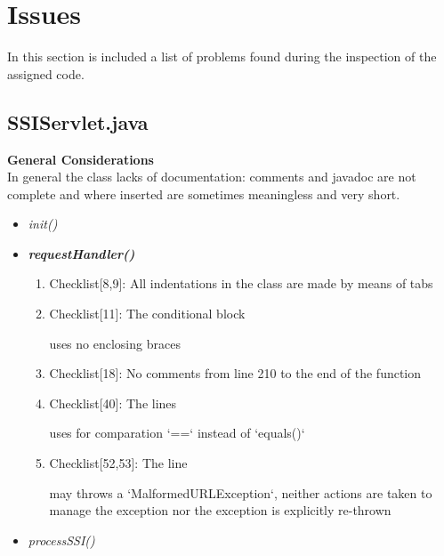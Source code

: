 \documentclass[11pt,titlepage]{article} %
\begin{document}
\section{Issues}
In this section is included a list of problems found during the inspection of the assigned code.
\subsection{SSIServlet.java}
  \textbf{General Considerations} \hfill \\
  In general the class lacks of documentation: comments and javadoc are not complete and where inserted are sometimes meaningless and very short.
  \begin{itemize}
   \item \textit{init()}
   \item \textbf{\textit{requestHandler()}}
    \begin{enumerate}
     \item Checklist[8,9]: All indentations in the class are made by means of tabs
     \item Checklist[11]: The conditional block
      
      uses no enclosing braces
     \item Checklist[18]: No comments from line 210 to the end of the function
     \item Checklist[40]: The lines
      
      
      
      
      uses for comparation `==` instead of `equals()`
     \item Checklist[52,53]: The line 
      
      may throws a `MalformedURLException`, neither actions are taken to manage the exception nor the exception is explicitly re-thrown
    \end{enumerate}
   \item \textit{processSSI()}
  \end{itemize}
\end{document}
